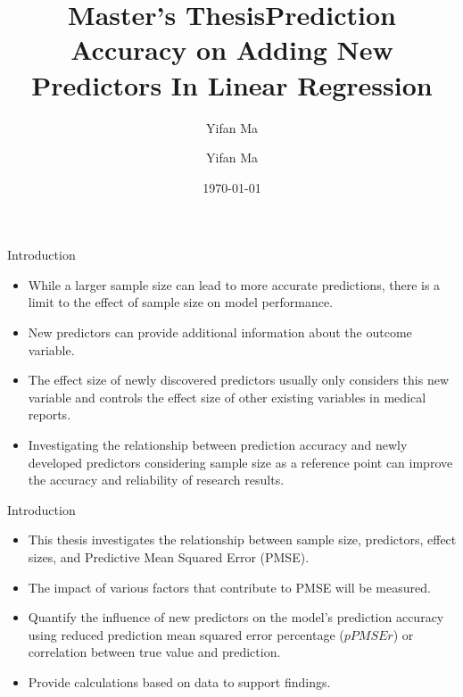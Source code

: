 \documentclass{beamer}
\author{Yifan Ma}
\title{Master's Thesis}
\begin{document}
\begin{frame}
\title{Prediction Accuracy on Adding New Predictors 
In Linear Regression}
\author{Yifan Ma}
\date{\today}

\maketitle
\end{frame}

\begin{frame}{Introduction}

\begin{itemize}

\item While a larger sample size can lead to more accurate predictions, there is a limit to the effect of sample size on model performance.
\item New predictors can provide additional information about the outcome variable.

\item The effect size of newly discovered predictors usually only considers this new variable and controls the effect size of other existing variables in medical reports.

\item Investigating the relationship between prediction accuracy and newly developed predictors considering sample size as a reference point can improve the accuracy and reliability of research results.

\end{itemize}

\end{frame}


\begin{frame}{Introduction}

\begin{itemize}
\item This thesis investigates the relationship between sample size, predictors, effect sizes, and Predictive Mean Squared Error (PMSE).
\item The impact of various factors that contribute to PMSE will be measured.
\item Quantify the influence of new predictors on the model's prediction accuracy using reduced prediction mean squared error percentage ($pPMSEr$) or correlation between true value and prediction.
\item Provide calculations based on data to support findings.

\end{itemize}

\end{frame}
\end{document}
